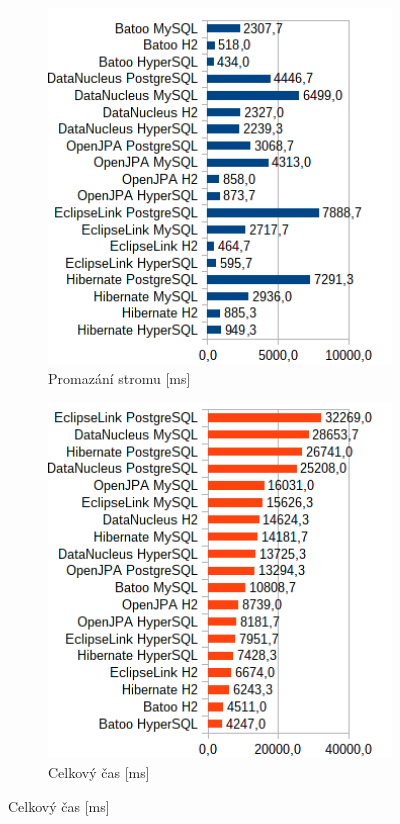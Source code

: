 \begin{figure}[!h]\ContinuedFloat
  \begin{subfigure}[b]{1\textwidth}
  \includegraphics[width=25em]{obr/bench/jpa13}
  \caption{Promazání stromu [ms]}\label{img:jpa13}
  \end{subfigure}
  \begin{subfigure}[b]{1\textwidth}
  \includegraphics[width=25em]{obr/bench/jpa14}
  \caption{Celkový čas [ms]}\label{img:jpa14}
  \end{subfigure}
\end{figure}
